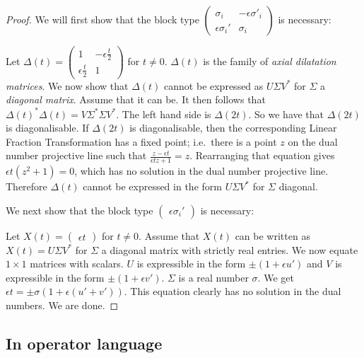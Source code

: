 \documentclass[
]{article}
\theoremstyle{theorem}
\theoremstyle{proposition}
\begin{document}
\begin{proof}
We will first show that the block type \(\begin{pmatrix}\sigma_i & -\epsilon \sigma'_i \\ \epsilon\sigma_i' & \sigma_i\end{pmatrix}\) is necessary:

Let \(\Delta(t) = \begin{pmatrix}1 & -\epsilon\frac{t}{2} \\ \epsilon\frac{t}{2} & 1\end{pmatrix}\) for \(t \neq 0\). \(\Delta(t)\) is the family of \emph{axial dilatation matrices}. We now show that \(\Delta(t)\) cannot be expressed as \(U \Sigma V^*\) for \(\Sigma\) a \emph{diagonal matrix}. Assume that it can be. It then follows that \(\Delta(t)^*\Delta(t) = V \Sigma^* \Sigma V^*\). The left hand side is \(\Delta(2t)\). So we have that \(\Delta(2t)\) is diagonalisable. If \(\Delta(2t)\) is diagonalisable, then the corresponding Linear Fraction Transformation has a fixed point; i.e.~there is a point \(z\) on the dual number projective line such that \(\frac{z - \epsilon t}{\epsilon t z + 1} = z\). Rearranging that equation gives \(\epsilon t(z^2 + 1) = 0\), which has no solution in the dual number projective line. Therefore \(\Delta(t)\) cannot be expressed in the form \(U\Sigma V^*\) for \(\Sigma\) diagonal.

We next show that the block type \(\begin{pmatrix} \epsilon\sigma_i'\end{pmatrix}\) is necessary:

Let \(X(t) = \begin{pmatrix} \epsilon t\end{pmatrix}\) for \(t \neq 0\). Assume that \(X(t)\) can be written as \(X(t) = U \Sigma V^*\) for \(\Sigma\) a diagonal matrix with strictly real entries. We now equate $1 \times 1$ matrices with scalars. \(U\) is expressible in the form \(\pm (1 + \epsilon u')\) and \(V\) is expressible in the form \(\pm (1 + \epsilon v')\). \(\Sigma\) is a real number \(\sigma\). We get \(\epsilon t = \pm \sigma(1 + \epsilon(u' + v'))\). This equation clearly has no solution in the dual numbers. We are done.

\end{proof}

\subsection{In operator language}
\end{document}
